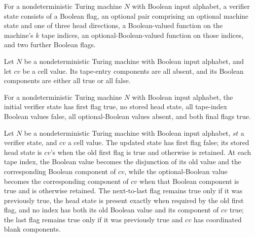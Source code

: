 \begin{definition}
\label{Complexity.Codec.VSt}
\leanok
{}
For a nondeterministic Turing machine $N$ with Boolean input alphabet, a verifier state
consists of a Boolean flag, an optional pair comprising an optional machine state and
one of three head directions, a Boolean-valued function on the machine's $k$ tape
indices, an optional-Boolean-valued function on those indices, and two further Boolean
flags.
\end{definition}

\begin{definition}
\label{Complexity.Codec.BlankTogether}
\leanok
{}
Let $N$ be a nondeterministic Turing machine with Boolean input alphabet, and let $cv$
be a cell value. Its tape-entry components are all absent, and its Boolean components
are either all true or all false.
\end{definition}

\begin{definition}
\label{Complexity.Codec.vInit}
\leanok
{}
For a nondeterministic Turing machine $N$ with Boolean input alphabet, the initial
verifier state has first flag true, no stored head state, all tape-index Boolean values
false, all optional-Boolean values absent, and both final flags true.
\end{definition}

\begin{definition}
\label{Complexity.Codec.vStep}
\leanok
{}
Let $N$ be a nondeterministic Turing machine with Boolean input alphabet, $st$ a
verifier state, and $cv$ a cell value. The updated state has first flag false; its
stored head state is $cv$'s when the old first flag is true and otherwise is retained.
At each tape index, the Boolean value becomes the disjunction of its old value and the
corresponding Boolean component of $cv$, while the optional-Boolean value becomes the
corresponding component of $cv$ when that Boolean component is true and is otherwise
retained. The next-to-last flag remains true only if it was previously true, the head
state is present exactly when required by the old first flag, and no index has both its
old Boolean value and its component of $cv$ true; the last flag remains true only if it
was previously true and $cv$ has coordinated blank components.
\end{definition}


